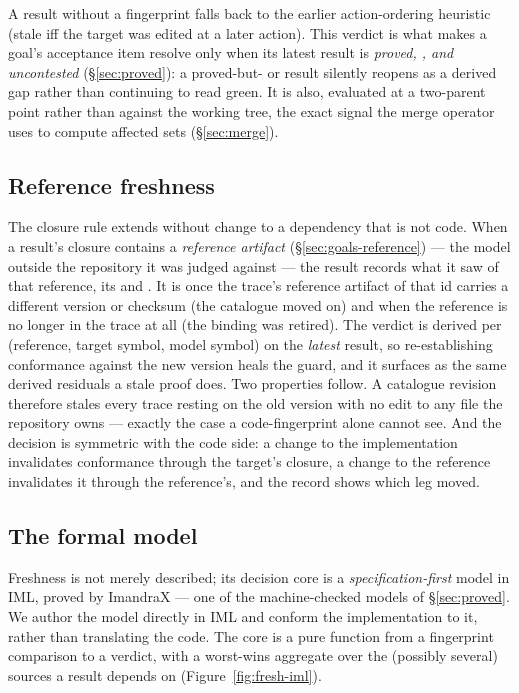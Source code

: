 A result without a fingerprint falls back to the earlier action-ordering heuristic (stale iff the
target was edited at a later action). This verdict is what makes a goal's  acceptance
item resolve  only when its latest result is \emph{proved, , and
uncontested} (\S\ref{sec:proved}): a proved-but- or  result silently reopens
as a derived gap rather than continuing to read green. It is also, evaluated at a two-parent point rather
than against the working tree, the exact signal the merge operator uses to compute affected sets
(\S\ref{sec:merge}).

\subsection{Reference freshness}\label{sec:freshness-reference}

The closure rule extends without change to a dependency that is not code. When a result's closure contains
a \emph{reference artifact} (\S\ref{sec:goals-reference}) --- the model outside the repository it was judged
against --- the result records what it saw of that reference, its  and
. It is  once the trace's reference artifact of that id carries a
different version or checksum (the catalogue moved on) and  when the reference is no longer
in the trace at all (the binding was retired). The verdict is derived per (reference, target symbol,
model symbol) on the \emph{latest} result, so re-establishing conformance against the new version heals the
guard, and it surfaces as the same derived residuals a stale proof does. Two properties follow. A catalogue
revision therefore stales every trace resting on the old version with no edit to any file the repository
owns --- exactly the case a code-fingerprint alone cannot see. And the decision is symmetric with the code
side: a change to the implementation invalidates conformance through the target's closure, a change to the
reference invalidates it through the reference's, and the record shows which leg moved.

\subsection{The formal model}\label{sec:freshness-model}

Freshness is not merely described; its decision core is a \emph{specification-first} model in IML, proved
by ImandraX --- one of the machine-checked models of \S\ref{sec:proved}. We author the model directly in
IML and conform the implementation to it, rather than translating the code. The core is a pure function
from a fingerprint comparison to a verdict, with a worst-wins aggregate over the (possibly several)
sources a result depends on (Figure~\ref{fig:fresh-iml}).

